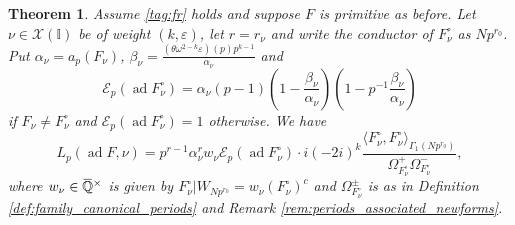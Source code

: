 \documentclass[12pt]{amsart}
\newcommand\bI{\mathbb{I}}
\newcommand\bQ{\mathbb{Q}}
\newcommand\cE{\mathcal{E}}
\newcommand\cX{\mathcal{X}}
\newcommand{\ob}[1]{\mkern 1.5mu\overline{\mkern-1.5mu#1\mkern-1.5mu}\mkern 1.5mu}
\DeclareMathOperator{\ad}{ad}
\theoremstyle{defstyle}
\theoremstyle{thmstyle}
\newtheorem{theorem}[subsubsection]{Theorem}
\begin{document}
\begin{theorem}\label{thm:calcul_valeurs_speciales}
	Assume \eqref{tag:fr} holds and suppose $F$ is primitive as before. Let $\nu\in\cX(\bI)$ be of weight $(k,\varepsilon)$, let $r=r_\nu$ and write the conductor of $F_\nu^\circ$ as $Np^{r_0}$. Put $\alpha_\nu=a_p(F_\nu)$, $\beta_\nu=\frac{(\theta\omega^{2-k}\varepsilon)(p)p^{k-1}}{\alpha_\nu}$ and
	\[\cE_p(\ad F_\nu^\circ)=\alpha_\nu(p-1)(1-\frac{\beta_\nu}{\alpha_\nu})(1-p^{-1}\frac{\beta_\nu}{\alpha_\nu}) \]
	if $F_\nu\neq F_\nu^\circ$ and $\cE_p(\ad F_\nu^\circ)=1$ otherwise. We have
	\begin{equation}
		L_p(\ad F,\nu)=p^{r-1}\alpha_\nu^r w_\nu\cE_p(\ad F_\nu^\circ)\cdot i(-2i)^{k}\dfrac{ \langle F_\nu^\circ,F_\nu^\circ \rangle_{\Gamma_1(Np^{r_0})}}{\Omega^+_{F^\circ_\nu}\Omega^-_{F^\circ_\nu}},
	\end{equation}
	where $w_\nu\in \ob{\bQ}^\times$ is given by $F_\nu^\circ|W_{Np^{r_0}}=w_\nu (F_\nu^\circ)^c$ and $\Omega_{F^\circ_\nu}^\pm$ is as in Definition \ref{def:family_canonical_periods} and Remark \ref{rem:periods_associated_newforms}.
\end{theorem}
\end{document}
